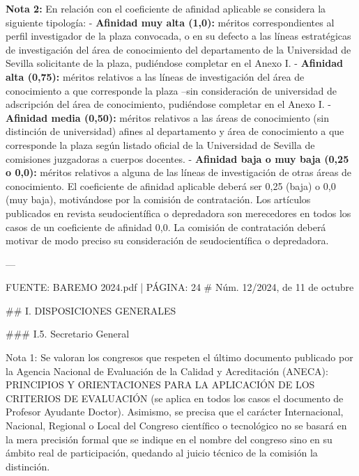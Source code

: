 \documentclass{article}
\begin{document}
\begin{itemize}
\begin{itemize}
\begin{scriptsize}
                  \textbf{Nota 2:} En relación con el coeficiente de afinidad aplicable se considera la siguiente tipología:
                  - \textbf{Afinidad muy alta (1,0):} méritos correspondientes al perfil investigador de la plaza convocada, o en su defecto a las líneas estratégicas de investigación del área de conocimiento del departamento de la Universidad de Sevilla solicitante de la plaza, pudiéndose completar en el Anexo I.
                  - \textbf{Afinidad alta (0,75):} méritos relativos a las líneas de investigación del área de conocimiento a que corresponde la plaza –sin consideración de universidad de adscripción del área de conocimiento, pudiéndose completar en el Anexo I.
                  - \textbf{Afinidad media (0,50):} méritos relativos a las áreas de conocimiento (sin distinción de universidad) afines al departamento y área de conocimiento a que corresponde la plaza según listado oficial de la Universidad de Sevilla de comisiones juzgadoras a cuerpos docentes.
                  - \textbf{Afinidad baja o muy baja (0,25 o 0,0):} méritos relativos a alguna de las líneas de investigación de otras áreas de conocimiento. El coeficiente de afinidad aplicable deberá ser 0,25 (baja) o 0,0 (muy baja), motivándose por la comisión de contratación. Los artículos publicados en revista seudocientífica o depredadora son merecedores en todos los casos de un coeficiente de afinidad 0,0. La comisión de contratación deberá motivar de modo preciso su consideración de seudocientífica o depredadora.

                  ---

                  FUENTE: BAREMO 2024.pdf | PÁGINA: 24
                  \# Núm. 12/2024, de 11 de octubre

                  \#\# I. DISPOSICIONES GENERALES

                  \#\#\# I.5. Secretario General

                  Nota 1: Se valoran los congresos que respeten el último documento publicado por la Agencia Nacional de Evaluación de la Calidad y Acreditación (ANECA): PRINCIPIOS Y ORIENTACIONES PARA LA APLICACIÓN DE LOS CRITERIOS DE EVALUACIÓN (se aplica en todos los casos el documento de Profesor Ayudante Doctor). Asimismo, se precisa que el carácter Internacional, Nacional, Regional o Local del Congreso científico o tecnológico no se basará en la mera precisión formal que se indique en el nombre del congreso sino en su ámbito real de participación, quedando al juicio técnico de la comisión la distinción.


\end{scriptsize}
\end{itemize}
\end{itemize}
\end{document}
